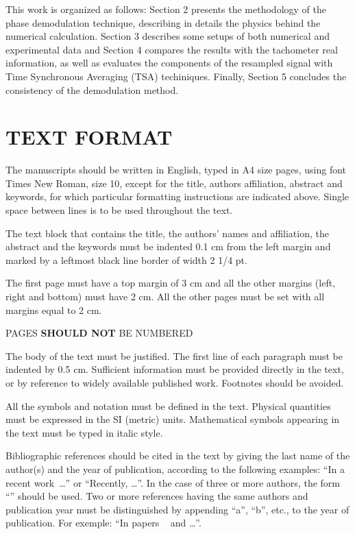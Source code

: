 \documentclass[10pt,fleqn,a4paper,twoside]{article}
\begin{document}
This work is organized as follows: Section 2 presents the methodology of the phase demodulation technique, describing in details the physics behind the numerical calculation. Section 3 describes some setups of both numerical and experimental data and Section 4 compares the results with the tachometer real information, as well as evaluates the components of the resampled signal with Time Synchronous Averaging (TSA) techiniques. Finally, Section 5 concludes the consistency of the demodulation method.






\section{TEXT FORMAT}

The manuscripts should be written in English, typed in A4 size pages, using font Times New Roman, size 10, except for the title, authors affiliation, abstract and keywords, for which particular formatting instructions are indicated above. Single space between lines is to be used throughout the text.

The text block that contains the title, the authors' names and affiliation, the abstract and the keywords must be indented 0.1 cm from the left margin and marked by a leftmost black line border of width 2 1/4 pt.

The first page must have a top margin of 3 cm and all the other margins (left, right and bottom) must have 2 cm. All the other pages must be set with all margins equal to 2 cm.

PAGES {\bf SHOULD NOT} BE NUMBERED

The body of the text must be justified. The first line of each paragraph must be indented by 0.5 cm. Sufficient information must be provided directly in the text, or by reference to widely available published work. Footnotes should be avoided.

All the symbols and notation must be defined in the text. Physical quantities must be expressed in the SI (metric) units. Mathematical symbols appearing in the text must be typed in italic style.

Bibliographic references should be cited in the text by giving the last name of the author(s) and the year of publication, according to the following examples: ``In a recent work~\citep{BandarraFilho2011}\dots'' or ``Recently, \citet{BandarraFilho2011}\dots''. In the case of three or more authors, the form ``\citep{CavaliniJunior2015}'' should be used. Two or more references having the same authors and publication year must be distinguished by appending ``a'', ``b'', etc., to the year of publication. For exemple: ``In papers ~\citep{Santos2013a} and \citep{Santos2013b}\dots''.
\end{document}
